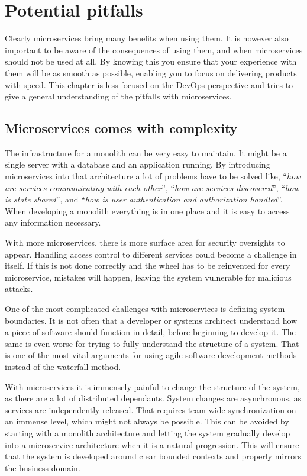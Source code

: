 \documentclass[a4paper]{article}
\begin{document}
\pagebreak
\section{Potential pitfalls}
\label{sec:pitfalls}

Clearly microservices bring many benefits when using them. It is however also important to be aware of the consequences of using them, and when microservices should not be used at all. By knowing this you ensure that your experience with them will be as smooth as possible, enabling you to focus on delivering products with speed. This chapter is less focused on the DevOps perspective and tries to give a general understanding of the pitfalls with microservices.


\subsection{Microservices comes with complexity}
\label{sec:pitfalls:complexity}
The infrastructure for a monolith can be very easy to maintain. It might be a single server with a database and an application running. By introducing microservices into that architecture a lot of problems have to be solved like, ``\textit{how are services communicating with each other}'', ``\textit{how are services discovered}'', ``\textit{how is state shared}'', and ``\textit{how is user authentication and authorization handled}''. When developing a monolith everything is in one place and it is easy to access any information necessary.

With more microservices, there is more surface area for security oversights to appear. Handling access control to different services could become a challenge in itself. If this is not done correctly and the wheel has to be reinvented for every microservice, mistakes will happen, leaving the system vulnerable for malicious attacks.

One of the most complicated challenges with microservices is defining system boundaries. It is not often that a developer or systems architect understand how a piece of software should function in detail, before beginning to develop it. The same is even worse for trying to fully understand the structure of a system. That is one of the most vital arguments for using agile software development methods instead of the waterfall method.

With microservices it is immensely painful to change the structure of the system, as there are a lot of distributed dependants. System changes are asynchronous, as services are independently released. That requires team wide synchronization on an immense level, which might not always be possible. This can be avoided by starting with a monolith architecture and letting the system gradually develop into a microservice architecture when it is a natural progression. This will ensure that the system is developed around clear bounded contexts and properly mirrors the business domain. \cite{Fowler2015}
\end{document}
